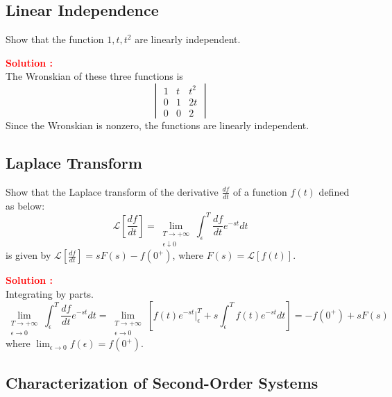 \documentclass[12pt]{article}
\begin{document}
\clearpage
\subsection{Linear Independence}

Show that the function \(1,t,t^2\) are linearly independent.


\textbf{\textcolor{red}{Solution :}} \\

The Wronskian of these three functions is 
\begin{equation}
    \begin{vmatrix}
1 & t  & t^2 \\

0 & 1  & 2t \\
0 & 0 & 2

\end{vmatrix}
\end{equation}
Since the Wronskian is nonzero, the functions are linearly independent.


\clearpage
\subsection{Laplace Transform}

Show that the Laplace transform of the derivative \(\frac{df}{dt}\) of a function \(f(t)\) defined as below:
\begin{equation}
    \mathcal{L}\left[ \frac{df}{dt} \right] = \lim_{\substack{T \to +\infty \\ \epsilon \downarrow 0}} \int_{\epsilon}^T \frac{df}{dt} e^{-st} dt
\end{equation}
is given by \(\mathcal{L}\left[ \frac{df}{dt} \right] = sF(s)-f(0^+)\), where \(F(s) = \mathcal{L}[f(t)]\).

\textbf{\textcolor{red}{Solution :}} \\
Integrating by parts.
\begin{equation}
    \lim_{\substack{T \to +\infty \\ \epsilon \to 0}} \int_{\epsilon}^T \frac{df}{dt} e^{-st} dt = \lim_{\substack{T \to +\infty \\ \epsilon \to 0}} \left[ f(t) e^{-st}|_{\epsilon}^T + s \int_{\epsilon}^T f(t) e^{-st} dt\right] = -f(0^+)+s F(s)
\end{equation}
where \(\lim_{\epsilon \rightarrow 0}f(\epsilon) = f(0^+)\).

\clearpage
\subsection{Characterization of Second-Order Systems}
\end{document}
